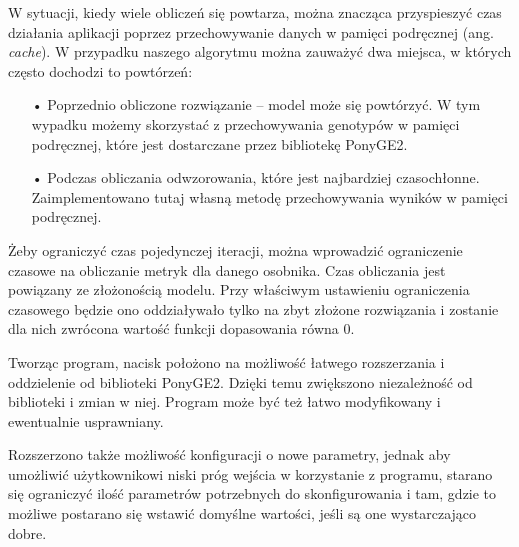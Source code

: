 W sytuacji, kiedy wiele obliczeń się powtarza, można znacząca przyspieszyć czas działania aplikacji poprzez przechowywanie danych w pamięci podręcznej (ang. \textit{cache}). W przypadku naszego algorytmu można zauważyć dwa miejsca, w których często dochodzi to powtórzeń:
\begin{itemize}
  \item[•] Poprzednio obliczone rozwiązanie -- model może się powtórzyć. W tym wypadku możemy skorzystać z przechowywania genotypów w pamięci podręcznej, które jest dostarczane przez bibliotekę PonyGE2.
  \item[•] Podczas obliczania odwzorowania, które jest najbardziej czasochłonne. Zaimplementowano tutaj własną metodę przechowywania wyników w pamięci podręcznej.
\end{itemize}

Żeby ograniczyć czas pojedynczej iteracji, można wprowadzić ograniczenie czasowe na obliczanie metryk dla danego osobnika. Czas obliczania jest powiązany ze złożonością modelu. Przy właściwym ustawieniu ograniczenia czasowego będzie ono oddziaływało tylko na zbyt złożone rozwiązania i zostanie dla nich zwrócona wartość funkcji dopasowania równa 0.

Tworząc program, nacisk położono na możliwość łatwego rozszerzania i oddzielenie od biblioteki PonyGE2. Dzięki temu zwiększono niezależność od biblioteki i zmian w niej. Program może być też łatwo modyfikowany i ewentualnie usprawniany. 

Rozszerzono także możliwość konfiguracji o nowe parametry, jednak aby umożliwić użytkownikowi niski próg wejścia w korzystanie z programu, starano się ograniczyć ilość parametrów potrzebnych do skonfigurowania i tam, gdzie to możliwe postarano się wstawić domyślne wartości, jeśli są one wystarczająco dobre. 


